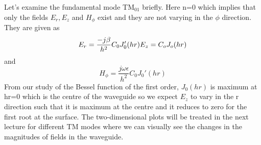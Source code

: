 Let's examine the fundamental mode TM$_{01}$ briefly. Here n=0 which implies that only the fields $E_r, E_z$ and $H_\phi$ exist and they are not varying in the $\phi$ direction. They are given as
$$
E_r=\frac{-j\beta}{h^2}C_0J_0'(hr)\\
E_z=C_oJ_o(hr)
$$
and
$$
H_\phi=\frac{j\omega\epsilon}{h^2}C_0J_0'(hr)
$$
From our study of the Bessel function of the first order, $J_0(hr)$ is maximum at hr=0 which is the centre of the waveguide so we expect $E_z$ to vary in the r direction such that it is maximum at the centre and it reduces to zero for the first root at the surface. The two-dimensional plots will be treated in the next lecture for different TM modes where we can visually see the changes in the magnitudes of fields in the waveguide.
